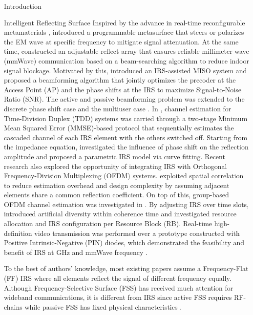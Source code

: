 \documentclass{IEEEtran}
\begin{document}
\begin{section}{Introduction}
\begin{subsection}{Intelligent Reflecting Surface}
		Inspired by the advance in real-time reconfigurable metamaterials \cite{Cui2014}, \cite{Liaskos2018} introduced a programmable metasurface that steers or polarizes the EM wave at specific frequency to mitigate signal attenuation. At the same time, \cite{Tan2018} constructed an adjustable reflect array that ensures reliable millimeter-wave (mmWave) communication based on a beam-searching algorithm to reduce indoor signal blockage. Motivated by this, \cite{Wu2018,Wu2019} introduced an IRS-assisted MISO system and proposed a beamforming algorithm that jointly optimizes the precoder at the Access Point (AP) and the phase shifts at the IRS to maximize Signal-to-Noise Ratio (SNR). The active and passive beamforming problem was extended to the discrete phase shift case \cite{Wu2019a} and the multiuser case \cite{Guo2019a}. In \cite{Nadeem2019}, channel estimation for Time-Division Duplex (TDD) systems was carried through a two-stage Minimum Mean Squared Error (MMSE)-based protocol that sequentially estimates the cascaded channel of each IRS element with the others switched off. Starting from the impedance equation, \cite{Abeywickrama2019} investigated the influence of phase shift on the reflection amplitude and proposed a parametric IRS model via curve fitting. Recent research also explored the opportunity of integrating IRS with Orthogonal Frequency-Division Multiplexing (OFDM) systems. \cite{Yang2019} exploited spatial correlation to reduce estimation overhead and design complexity by assuming adjacent elements share a common reflection coefficient. On top of this, group-based OFDM channel estimation was investigated in \cite{Zheng2019}. By adjusting IRS over time slots, \cite{Yang2020} introduced artificial diversity within coherence time and investigated resource allocation and IRS configuration per Resource Block (RB). Real-time high-definition video transmission was performed over a prototype constructed with Positive Intrinsic-Negative (PIN) diodes, which demonstrated the feasibility and benefit of IRS at GHz and mmWave frequency \cite{Dai2020}.

		To the best of authors' knowledge, most existing papers assume a Frequency-Flat (FF) IRS where all elements reflect the signal of different frequency equally. Although Frequency-Selective Surface (FSS) has received much attention for wideband communications, it is different from IRS since active FSS requires RF-chains \cite{Kim2006,Xu2014} while passive FSS has fixed physical characteristics \cite{Anwar2018}.
	\end{subsection}


\end{section}
\end{document}

